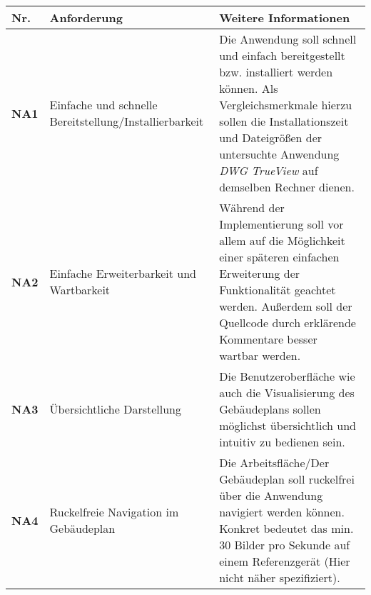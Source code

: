 \begin{center}
    \small
    \begin{supertabular}{ p{1cm}|p{3cm}|p{4cm} }
        Nr. & Anforderung & Weitere Informationen \\
        \hline
        \textbf{NA1} & Einfache und schnelle Bereitstellung/Installierbarkeit & Die Anwendung soll schnell und einfach bereitgestellt bzw. installiert werden können. Als Vergleichsmerkmale hierzu sollen die Installationszeit und Dateigrößen der untersuchte Anwendung \textit{DWG TrueView} auf demselben Rechner dienen. \\
        \textbf{NA2} & Einfache Erweiterbarkeit und Wartbarkeit & Während der Implementierung soll vor allem auf die Möglichkeit einer späteren einfachen Erweiterung der Funktionalität geachtet werden. Außerdem soll der Quellcode durch erklärende Kommentare besser wartbar werden. \\
        \textbf{NA3} & Übersichtliche Darstellung & Die Benutzeroberfläche wie auch die Visualisierung des Gebäudeplans sollen möglichst übersichtlich und intuitiv zu bedienen sein. \\
        \textbf{NA4} & Ruckelfreie Navigation im Gebäudeplan & Die Arbeitsfläche/Der Gebäudeplan soll ruckelfrei über die Anwendung navigiert werden können. Konkret bedeutet das min. 30 Bilder pro Sekunde auf einem Referenzgerät (Hier nicht näher spezifiziert). \\
    \end{supertabular}
\end{center}
